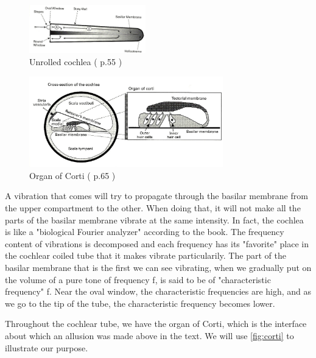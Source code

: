
\begin{figure}[h]
	\centering
	\includegraphics[width=0.45\textwidth]{images/cochlea-aud55-level.jpg}
	\caption{Unrolled cochlea (\cite{AuditoryNeuroscience} p.55 )}
	\label{fig:ucochlea}
\end{figure}

\begin{figure}[ht]
	\centering
  \includegraphics[width=0.75\textwidth]{images/corti2-aud65-level.jpg}
	\caption{Organ of Corti (\cite{AuditoryNeuroscience} p.65 )}
	\label{fig:corti}
\end{figure}

A vibration that comes will try to propagate through the basilar membrane from 
the upper compartment to the other. When doing that, it will not make all 
the parts of the basilar membrane vibrate at the same intensity. 
In fact, the cochlea is like a "biological Fourier analyzer" according to the book. 
The frequency content of vibrations is decomposed and each frequency has its 
"favorite" place in the cochlear coiled tube that it makes vibrate particularily. 
The part of the basilar membrane that is the first we can see vibrating, 
when we gradually put on the volume of a pure tone of frequency f, is said to be of 
"characteristic frequency" f. Near the oval window, the characteristic 
frequencies are high, and as we go to the tip of the tube, 
the characteristic frequency becomes lower.

Throughout the cochlear tube, we have the organ of Corti, which is the interface
about which an allusion was made above in the text. We will use \autoref{fig:corti} to illustrate our purpose.

